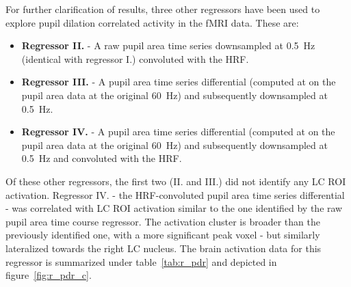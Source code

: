 	
	For further clarification of results, three other regressors have been used to explore pupil dilation correlated activity in the fMRI data.
	These are:
	\begin{itemize}
	    \item \textbf{Regressor II.} - A raw pupil area time series downsampled at \SI{0.5}{\hertz} (identical with regressor I.) convoluted with the HRF.
	    \item \textbf{Regressor III.} - A pupil area time series differential (computed at on the pupil area data at the original \SI{60}{\hertz}) and subsequently downsampled at \SI{0.5}{\hertz}. 
	    \item \textbf{Regressor IV.} - A pupil area time series differential (computed at on the pupil area data at the original \SI{60}{\hertz}) and subsequently downsampled at \SI{0.5}{\hertz} and convoluted with the HRF.
	\end{itemize}
	
	Of these other regressors, the first two (II. and III.) did not identify any LC ROI activation.
	Regressor IV. - the HRF-convoluted pupil area time series differential - was correlated with LC ROI activation similar to the one identified by the raw pupil area time course regressor.
	The activation cluster is broader than the previously identified one, with a more significant peak voxel - but similarly lateralized towards the right LC nucleus.
	The brain activation data for this regressor is summarized under table~\ref{tab:r_pdr} and depicted in figure~\ref{fig:r_pdr_c}.
	
	
